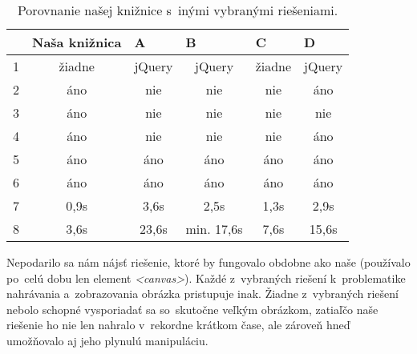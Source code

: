 \begin{table}[!htb]
	\centering
	\begin{tabular}{@{}|l|c|c|c|c|c|@{}}
	\toprule
		  		   & \multicolumn{1}{l|}{Naša knižnica} & \multicolumn{1}{l|}{A} & \multicolumn{1}{l|}{B} & \multicolumn{1}{l|}{C} & \multicolumn{1}{l|}{D} \\ \midrule
	1              & žiadne                & jQuery                 & jQuery                 & žiadne                 & jQuery                 \\ \midrule
	2 		       & áno                   & nie                    & nie                    & nie                    & áno                    \\ \midrule
	3  			   & áno                   & nie                    & nie                    & nie                    & nie                    \\ \midrule
	4			   & áno                   & nie                    & nie                    & nie                    & áno                    \\ \midrule
	5		       & áno                   & áno                    & áno                    & áno                    & áno                    \\ \midrule
	6              & áno                   & áno                    & áno                    & áno                    & áno                    \\ \midrule
	7 			   & 0,9s                  & 3,6s                   & 2,5s                   & 1,3s                   & 2,9s                  \\ \midrule
	8   		   & 3,6s                  & 23,6s                  & min. 17,6s 			 & 7,6s                   & 15,6s                 \\ \bottomrule
	\end{tabular}
	\caption{Porovnanie našej knižnice s~inými vybranými riešeniami.}
	\label{my-label}
\end{table}

Nepodarilo sa nám nájsť riešenie, ktoré by fungovalo obdobne ako naše (používalo po~celú dobu len element \emph{<canvas>}). Každé z~vybraných riešení k~problematike nahrávania a~zobrazovania obrázka pristupuje inak. Žiadne z~vybraných riešení nebolo schopné vysporiadať sa so~skutočne veľkým obrázkom, zatiaľčo naše riešenie ho nie len nahralo v~rekordne krátkom čase, ale zároveň hneď umožňovalo aj jeho plynulú manipuláciu.